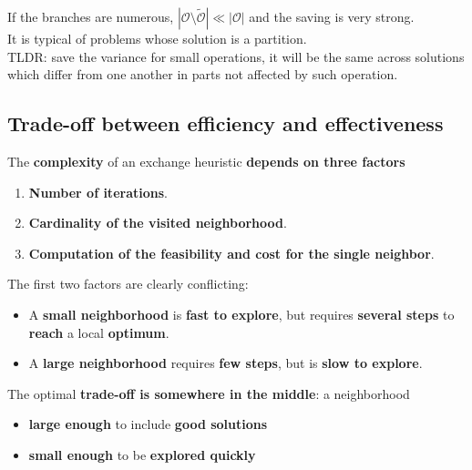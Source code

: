 If the branches are numerous, $|\mathcal{O} \setminus \tilde{\mathcal{O}}| \ll |\mathcal{O}|$ and the saving is very strong.\\
It is typical of problems whose solution is a partition.\\

TLDR: save the variance for small operations, it will be the same across solutions which differ from one another in parts not affected by such operation.\\

\newpage

\subsection{Trade-off between efficiency and effectiveness}
The \textbf{complexity} of an exchange heuristic \textbf{depends on three factors}
\begin{enumerate}
	\item \textbf{Number of iterations}.\\
	
	\item \textbf{Cardinality of the visited neighborhood}.\\
	
	\item \textbf{Computation of the feasibility and cost for the single neighbor}.\\
	
\end{enumerate}

The first two factors are clearly conflicting:
\begin{itemize}
	\item A \textbf{small neighborhood} is \textbf{fast to explore}, but requires \textbf{several steps} to \textbf{reach} a local \textbf{optimum}.\\
	
	\item A \textbf{large neighborhood} requires \textbf{few steps}, but is \textbf{slow to explore}.\\
\end{itemize}

The optimal \textbf{trade-off is somewhere in the middle}: a neighborhood
\begin{itemize}
	\item \textbf{large enough} to include \textbf{good solutions}
	\item \textbf{small enough} to be \textbf{explored quickly}
\end{itemize}

